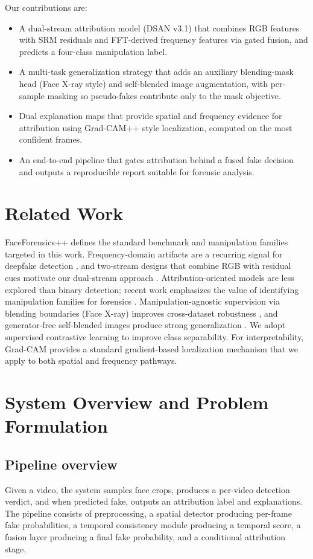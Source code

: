 \documentclass[conference]{IEEEtran}
\begin{document}
Our contributions are:
\begin{itemize}[leftmargin=*]
  \item A dual-stream attribution model (DSAN v3.1) that combines RGB features with SRM residuals and FFT-derived frequency features via gated fusion, and predicts a four-class manipulation label.
  \item A multi-task generalization strategy that adds an auxiliary blending-mask head (Face X-ray style) and self-blended image augmentation, with per-sample masking so pseudo-fakes contribute only to the mask objective.
  \item Dual explanation maps that provide spatial and frequency evidence for attribution using Grad-CAM++ style localization, computed on the most confident frames.
  \item An end-to-end pipeline that gates attribution behind a fused fake decision and outputs a reproducible report suitable for forensic analysis.
\end{itemize}

\section{Related Work}
FaceForensics++ \cite{Rossler2019FFPP} defines the standard benchmark and manipulation families targeted in this work. Frequency-domain artifacts are a recurring signal for deepfake detection \cite{Frank2020Frequency}, and two-stream designs that combine RGB with residual cues motivate our dual-stream approach \cite{Hao2021LearnableSRM}. Attribution-oriented models are less explored than binary detection; recent work emphasizes the value of identifying manipulation families for forensics \cite{FAME2025}. Manipulation-agnostic supervision via blending boundaries (Face X-ray) improves cross-dataset robustness \cite{Li2020FaceXray}, and generator-free self-blended images produce strong generalization \cite{Shiohara2022SBI}. We adopt supervised contrastive learning \cite{Khosla2020SupCon} to improve class separability. For interpretability, Grad-CAM \cite{Selvaraju2017GradCAM} provides a standard gradient-based localization mechanism that we apply to both spatial and frequency pathways.

\section{System Overview and Problem Formulation}
\subsection{Pipeline overview}
Given a video, the system samples face crops, produces a per-video detection verdict, and when predicted fake, outputs an attribution label and explanations. The pipeline consists of preprocessing, a spatial detector producing per-frame fake probabilities, a temporal consistency module producing a temporal score, a fusion layer producing a final fake probability, and a conditional attribution stage.
\end{document}
